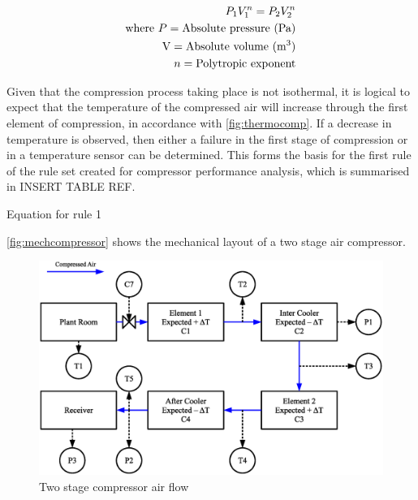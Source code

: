 \begin{eqnarray}
\label{eq:polytropcompression}
P_1 V_1^n = P_2 V_2^n \\
\text{where}~P = \text{Absolute pressure (Pa)} \nonumber \\
\text{V} = \text{Absolute volume (m\textsuperscript{3})} \nonumber \\ 
n = \text{Polytropic exponent} \nonumber
\end{eqnarray} 

Given that the compression process taking place is not isothermal, it is logical to expect that the temperature of the compressed air will increase through the first element of compression, in accordance with \autoref{fig:thermocomp}. If a decrease in temperature is observed, then either a failure in the first stage of compression or in a temperature sensor can be determined. This forms the basis for the first rule of the rule set created for compressor performance analysis, which is summarised in INSERT TABLE REF.

Equation for rule 1

\lipsum[1-10]

\autoref{fig:mechcompressor} shows the mechanical layout of a two stage air compressor.

\begin{figure}
\includegraphics[width = \textwidth]{./Images/2StageRotaryCompressorIdeal.eps}
\caption{Two stage compressor air flow}
\label{fig:compairflow}
\end{figure}


